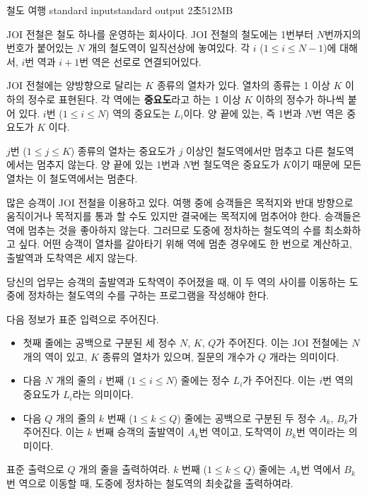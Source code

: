 \begin{problem}{철도 여행}
	{standard input}{standard output}
	{2초}{512MB}{}
	
	JOI 전철은 철도 하나를 운영하는 회사이다. JOI 전철의 철도에는 1번부터 $N$번까지의 번호가 붙어있는 $N$ 개의 철도역이 일직선상에 놓여있다. 각 $i$ ($1 \le i \le N-1$)에 대해서, $i$번 역과 $i+1$번 역은 선로로 연결되어있다.
	
	JOI 전철에는 양방향으로 달리는 $K$ 종류의 열차가 있다. 열차의 종류는 1 이상 $K$ 이하의 정수로 표현된다. 각 역에는 \textbf{중요도}라고 하는 1 이상 $K$ 이하의 정수가 하나씩 붙어 있다. $i$번 ($1 \le i \le N$) 역의 중요도는 $L_i$이다. 양 끝에 있는, 즉 1번과 $N$번 역은 중요도가 $K$ 이다.
	
	$j$번 ($1 \le j \le K$) 종류의 열차는 중요도가 $j$ 이상인 철도역에서만 멈추고 다른 철도역에서는 멈추지 않는다. 양 끝에 있는 1번과 $N$번 철도역은 중요도가 $K$이기 때문에 모든 열차는 이 철도역에서는 멈춘다.
	
	많은 승객이 JOI 전철을 이용하고 있다. 여행 중에 승객들은 목적지와 반대 방향으로 움직이거나 목적지를 통과 할 수도 있지만 결국에는 목적지에 멈추어야 한다. 승객들은 역에 멈추는 것을 좋아하지 않는다. 그러므로 도중에 정차하는 철도역의 수를 최소화하고 싶다. 어떤 승객이 열차를 갈아타기 위해 역에 멈춘 경우에도 한 번으로 계산하고, 출발역과 도착역은 세지 않는다.
	
	당신의 업무는 승객의 출발역과 도착역이 주어졌을 때, 이 두 역의 사이를 이동하는 도중에 정차하는 철도역의 수를 구하는 프로그램을 작성해야 한다.
	
	\InputFile
	
	다음 정보가 표준 입력으로 주어진다.
	
	\begin{itemize}
		\item 첫째 줄에는 공백으로 구분된 세 정수 $N$, $K$, $Q$가 주어진다. 이는 JOI 전철에는 $N$ 개의 역이 있고, $K$ 종류의 열차가 있으며, 질문의 개수가 $Q$ 개라는 의미이다.
		\item 다음 $N$ 개의 줄의 $i$ 번째 ($1 \le i \le N$) 줄에는 정수 $L_i$가 주어진다. 이는 $i$번 역의 중요도가 $L_i$라는 의미이다.
		\item 다음 $Q$ 개의 줄의 $k$ 번째 ($1 \le k \le Q$) 줄에는 공백으로 구분된 두 정수 $A_k$, $B_k$가 주어진다. 이는 $k$ 번째 승객의 출발역이 $A_k$번 역이고, 도착역이 $B_k$번 역이라는 의미이다.
	\end{itemize}
	
	
	\OutputFile
	
	표준 출력으로 $Q$ 개의 줄을 출력하여라. $k$ 번째 ($1 \le k \le Q$) 줄에는 $A_k$번 역에서 $B_k$번 역으로 이동할 때, 도중에 정차하는 철도역의 최솟값을 출력하여라.
	

\end{problem}
